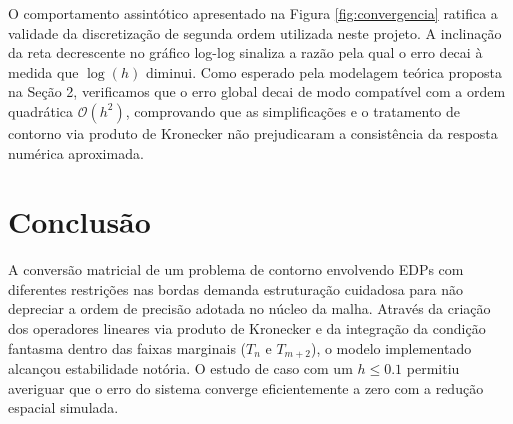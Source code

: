\documentclass[12pt, a4paper]{article}
\begin{document}
    O comportamento assintótico apresentado na Figura \ref{fig:convergencia} ratifica a validade da discretização de segunda ordem utilizada neste projeto. A inclinação da reta decrescente no gráfico log-log sinaliza a razão pela qual o erro decai à medida que $\log(h)$ diminui. Como esperado pela modelagem teórica proposta na Seção 2, verificamos que o erro global decai de modo compatível com a ordem quadrática $\mathcal{O}(h^2)$, comprovando que as simplificações e o tratamento de contorno via produto de Kronecker não prejudicaram a consistência da resposta numérica aproximada.

    \section{Conclusão}

    A conversão matricial de um problema de contorno envolvendo EDPs com diferentes restrições nas bordas demanda estruturação cuidadosa para não depreciar a ordem de precisão adotada no núcleo da malha. Através da criação dos operadores lineares via produto de Kronecker e da integração da condição fantasma dentro das faixas marginais ($T_n$ e $T_{m+2}$), o modelo implementado alcançou estabilidade notória. O estudo de caso com um $h \leq 0.1$ permitiu averiguar que o erro do sistema converge eficientemente a zero com a redução espacial simulada.
\end{document}
